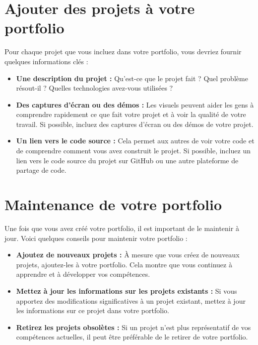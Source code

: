 \section{Ajouter des projets à votre portfolio}

Pour chaque projet que vous incluez dans votre portfolio, vous devriez fournir quelques informations clés :

\begin{itemize}
    \item \textbf{Une description du projet :} Qu'est-ce que le projet fait ? Quel problème résout-il ? Quelles technologies avez-vous utilisées ?
    \item \textbf{Des captures d'écran ou des démos :} Les visuels peuvent aider les gens à comprendre rapidement ce que fait votre projet et à voir la qualité de votre travail. Si possible, incluez des captures d'écran ou des démos de votre projet.
    \item \textbf{Un lien vers le code source :} Cela permet aux autres de voir votre code et de comprendre comment vous avez construit le projet. Si possible, incluez un lien vers le code source du projet sur GitHub ou une autre plateforme de partage de code.
\end{itemize}

\section{Maintenance de votre portfolio}

Une fois que vous avez créé votre portfolio, il est important de le maintenir à jour. Voici quelques conseils pour maintenir votre portfolio :

\begin{itemize}
    \item \textbf{Ajoutez de nouveaux projets :} À mesure que vous créez de  nouveaux projets, ajoutez-les à votre portfolio. Cela montre que vous continuez à apprendre et à développer vos compétences.
    \item \textbf{Mettez à jour les informations sur les projets existants :} Si vous apportez des modifications significatives à un projet existant, mettez à jour les informations sur ce projet dans votre portfolio.
    \item \textbf{Retirez les projets obsolètes :} Si un projet n'est plus représentatif de vos compétences actuelles, il peut être préférable de le retirer de votre portfolio.
\end{itemize}

